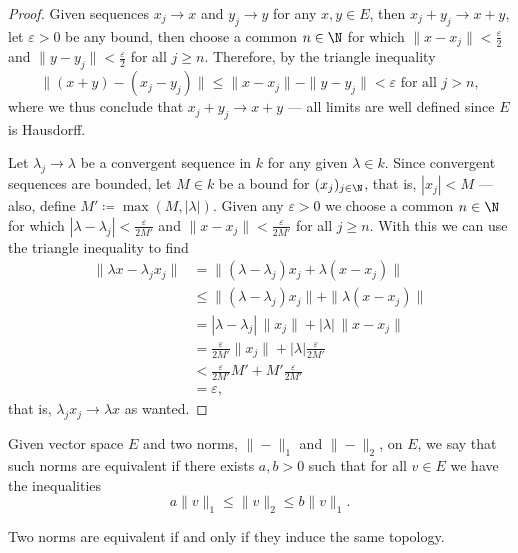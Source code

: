 \begin{proof}
Given sequences \(x_j \to x\) and \(y_j \to y\) for any \(x, y \in E\), then
\(x_j + y_j \to x + y\), let \(\varepsilon > 0\) be any bound, then choose a
common \(n \in \N\) for which \(\| x - x_j \| < \frac{\varepsilon}{2}\) and
\(\| y - y_{j} \| < \frac{\varepsilon}{2}\) for all \(j \geq n\). Therefore, by
the triangle inequality
\[
\| (x + y) - (x_j - y_j)\| \leq  \| x - x_j \| - \| y - y_j \| < \varepsilon
\text{ for all } j > n,
\]
where we thus conclude that \(x_j + y_j \to x + y\) --- all limits are well
defined since \(E\) is Hausdorff.

Let \(\lambda_j \to \lambda\) be a convergent sequence in \(k\) for any given
\(\lambda \in k\). Since convergent sequences are bounded, let \(M \in k\) be a
bound for \((x_j)_{j \in \N}\), that is, \(|x_j| < M\) --- also,
define \(M' \coloneq \max (M, |\lambda|)\). Given any \(\varepsilon > 0\) we
choose a common \(n \in \N\) for which \(|\lambda - \lambda_j| <
\frac{\varepsilon}{2 M'}\) and \(\| x - x_{j} \| < \frac{\varepsilon}{2 M'}\)
for all \(j \geq n\). With this we can use the triangle inequality to find
\begin{align*}
  \| \lambda x - \lambda_j x_j \|
  &= \| (\lambda - \lambda_j) x_j + \lambda (x - x_j)\| \\
  &\leq \| (\lambda - \lambda_{j}) x_j \| + \| \lambda (x - x_j) \| \\
  &= |\lambda - \lambda_j|\, \| x_j \| + |\lambda|\, \| x - x_j \| \\
  &= \frac{\varepsilon}{2 M'} \| x_{j} \| + |\lambda| \frac{\varepsilon}{2 M'}
  \\
  &< \frac{\varepsilon}{2 M'} M' + M' \frac{\varepsilon}{2 M'} \\
  &= \varepsilon,
\end{align*}
that is, \(\lambda_j x_j \to \lambda x\) as wanted.
\end{proof}

\begin{definition}
\label{def:equivalence-of-norms}
Given vector space \(E\) and two norms, \(\| - \|_1\) and \(\| - \|_2\), on
\(E\), we say that such norms are equivalent if there exists \(a, b > 0\) such
that for all \(v \in E\) we have the inequalities
\[
  a \| v \|_1 \leq \| v \|_2 \leq b \| v \|_1.
\]
\end{definition}

\begin{proposition}
\label{prop:equivalent-norms-same-topology}
Two norms are equivalent if and only if they induce the same topology.
\end{proposition}

